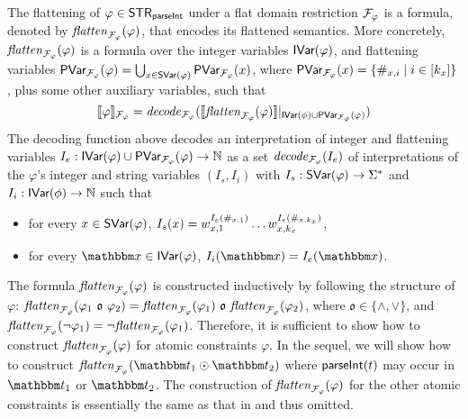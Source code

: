 The flattening of $\varphi \in {\sf STR}_{\textsf{parseInt}}$ under a flat domain restriction $\mathcal{F}_\varphi$ is a {\paexp} formula, denoted by $\mathit{flatten}_{\mathcal{F}_\varphi}(\varphi)$, that encodes its flattened semantics.
%
More concretely, $\mathit{flatten}_{\mathcal{F}_\varphi}(\varphi)$ is a formula over the integer variables $\textsf{IVar}(\varphi)$,  and flattening variables $\textsf{PVar}_{\mathcal{F}_\varphi}(\varphi) = \bigcup_{x \in \textsf{SVar}(\varphi)} \textsf{PVar}_{\mathcal{F}_\varphi}(x)$, where $\textsf{PVar}_{\mathcal{F}_\varphi}(x) = \{\#_{x,i} \mid i \in [k_x]\}$, plus some other auxiliary variables, such that 
%
$$\llbracket \varphi \rrbracket_{\mathcal{F}_\varphi} =\mathit{decode}_{\mathcal{F}_\varphi}(\llbracket \mathit{flatten}_{\mathcal{F}_\varphi}(\varphi) \rrbracket |_{\textsf{IVar}(\phi) \cup \textsf{PVar}_{\mathcal{F}_\varphi}(\varphi)})$$
%
The decoding function above decodes an interpretation of integer and flattening variables $I_e: \textsf{IVar}(\varphi) \cup \textsf{PVar}_{\mathcal{F}_\varphi}(\varphi) \rightarrow \mathbb{N}$ as a set $\mathit{decode}_{\mathcal{F}_\varphi}(I_e)$ of interpretations of the $\varphi$'s integer and string variables $(I_s, I_i)$ with $I_s: \textsf{SVar}(\varphi) \rightarrow \Sigma^*$ and $I_i: \textsf{IVar}(\phi) \rightarrow \mathbb{N}$ such that 
\begin{itemize}
\item  
for every $ x \in \textsf{SVar}(\varphi)$, $I_s(x) = w_{x,1}^{I_e(\#_{x,1})} \ldots  w_{x,k_x}^{I_e(\#_{x,k_x})}$, 
%
\item for every $ \ivarx \in \ivar(\varphi)$, $I_i(\ivarx) = I_e(\ivarx)$.
\end{itemize}

The formula $\mathit{flatten}_{\mathcal{F}_\varphi}(\varphi)$ is constructed inductively by following the structure of $\varphi$: $\flatten_{\flatfun_\varphi}(\varphi_1\ \mathfrak{o}\ \varphi_2) = \flatten_{\flatfun_\varphi}(\varphi_1) \ \mathfrak{o}\  \flatten_{\flatfun_\varphi}(\varphi_2)$, where $\mathfrak{o} \in \{\wedge, \vee\}$, and $\mathit{flatten}_{\mathcal{F}_\varphi}(\neg \varphi_1) = \neg \mathit{flatten}_{\mathcal{F}_\varphi}(\varphi_1)$. Therefore, it is sufficient to show how to construct $\mathit{flatten}_{\mathcal{F}_\varphi}(\varphi)$ for atomic constraints $\varphi$. 
In the sequel, we will show how to construct $\flatten_{\flatfun_\varphi}(\iterm_1 \op \iterm_2)$ where $\textsf{parseInt}(t)$ may occur in $\iterm_1$ or $\iterm_2$. The construction of $\mathit{flatten}_{\mathcal{F}_\varphi}(\varphi)$ for the other atomic constraints is essentially the same as that in \cite{Parosh:20:PLDI} and thus omitted. 


